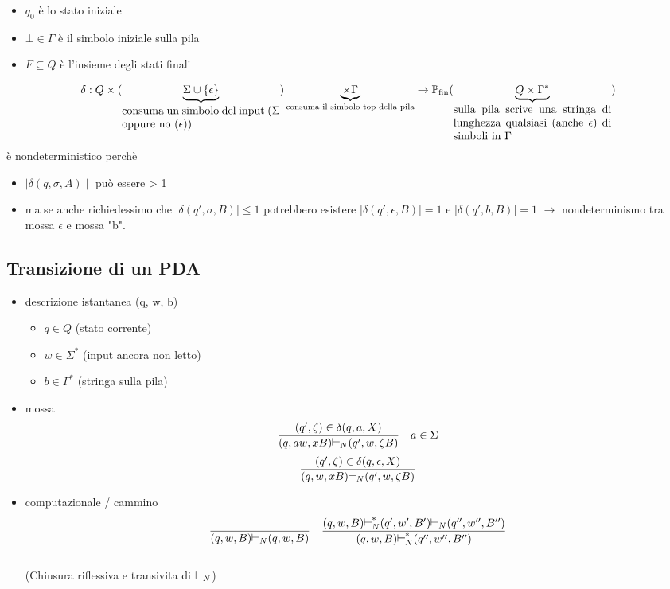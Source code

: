 \documentclass[a4paper,12pt]{article}
\begin{document}
{\begin{itemize}
\begin{align*}
  \end{align*}
  \item $q_0$ è lo stato iniziale 
  \item $\bot \in \Gamma$ è il simbolo iniziale sulla pila
  \item $F \subseteq Q$ è l'insieme degli stati finali
\end{itemize}
\begin{align*}
\delta : Q \times 
(\underbrace{\Sigma \cup \{\epsilon\}}_{\parbox{5cm}{consuma un simbolo del input ($\Sigma$ oppure no ($\epsilon$))}}) 
\underbrace{\times \Gamma}_{\text{consuma il simbolo top della pila}}
\to \mathbb{P}_\text{fin} (\underbrace{Q \times \Gamma^*}_{\parbox{5cm}{sulla pila scrive una stringa di lunghezza qualsiasi (anche $\epsilon$) di simboli in $\Gamma$}}) 
\end{align*}
è nondeterministico perchè
\begin{itemize}
  \item $\mid \delta(q, \sigma, A) \mid$ può essere > 1
  \item ma se anche richiedessimo che $\mid \delta(q', \sigma, B) \mid \leq 1$ potrebbero esistere $\mid \delta(q', \epsilon, B) \mid = 1$ e $\mid \delta(q', b, B) \mid = 1$ $\to$ nondeterminismo tra mossa $\epsilon$ e mossa "b".
\end{itemize}
\vspace{2em} 
\subsection*{Transizione di un PDA}
\begin{itemize}
  \item descrizione istantanea (q, w, b)
  \begin{itemize}
    \item $q \in Q$ (stato corrente) 
    \item $w \in \Sigma^*$ (input ancora non letto)
    \item $b \in \Gamma^*$ (stringa sulla pila)
  \end{itemize}
  \item mossa
  \begin{align*}
    \dfrac{(q', \zeta) \in \delta(q, a, X)}{(q, aw, xB) \rotatebox{90}{$\top$}_N (q', w, \zeta B)} \quad a \in \Sigma
  \end{align*}
    \begin{align*}
    \dfrac{(q', \zeta) \in \delta(q, \epsilon, X)}{(q, w, xB) \rotatebox{90}{$\top$}_N (q', w, \zeta B)} 
  \end{align*}
  \item computazionale / cammino
  \begin{align*}
    \dfrac{}{(q,w,B) \rotatebox{90}{$\top$}_N (q, w, B)} \quad \dfrac{(q,w,B) \rotatebox{90}{$\top$}_N^* (q',w',B')\rotatebox{90}{$\top$}_N(q'',w'',B'')}{(q,w,B)\rotatebox{90}{$\top$}_N^* (q'',w'',B'')}
  \end{align*} \\
  (Chiusura riflessiva e transivita di $\rotatebox{90}{$\top$}_N$)
\end{itemize}
}
\end{document}
